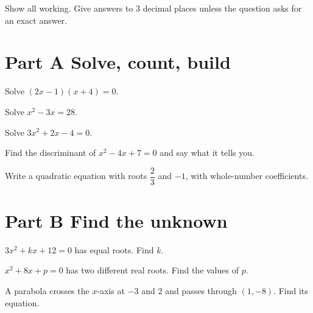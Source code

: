 \documentclass[11pt]{article}
\begin{document}

Show all working. Give answers to 3 decimal places unless the question asks for an exact answer.

\section*{Part A \textperiodcentered{} Solve, count, build}
Solve $(2x - 1)(x + 4) = 0$.

Solve $x^{2} - 3x = 28$.

Solve $3x^{2} + 2x - 4 = 0$.

Find the discriminant of $x^{2} - 4x + 7 = 0$ and say what it tells you.

Write a quadratic equation with roots $\dfrac{2}{3}$ and $-1$, with whole-number coefficients.

\section*{Part B \textperiodcentered{} Find the unknown}
$3x^{2} + kx + 12 = 0$ has equal roots. Find $k$.

$x^{2} + 8x + p = 0$ has two different real roots. Find the values of $p$.

A parabola crosses the $x$-axis at $-3$ and $2$ and passes through $(1, -8)$. Find its equation.
\end{document}
